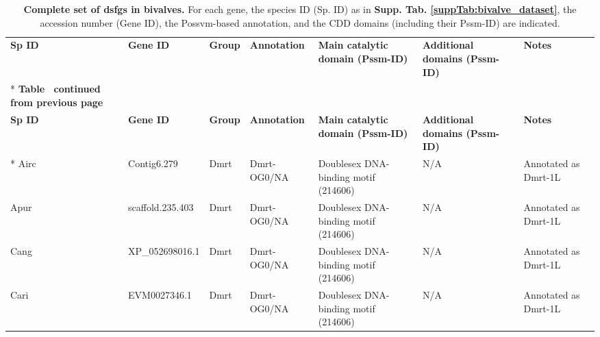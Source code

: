 \documentclass[../main.tex]{subfiles}
\begin{document}
\begin{landscape}
	\tiny
	\begin{longtable}{lllllll}
		\caption{\textbf{Complete set of \glspl{dsfg} in bivalves.} For each gene, the species ID (Sp. ID) as in \textbf{Supp. Tab. \ref{suppTab:bivalve_dataset}}, the accession number (Gene ID), the Possvm-based annotation, and the CDD domains (including their Pssm-ID) are indicated.}
		\label{suppTab:dsfg_bivalveAnnotation}                                                                                                                                                                                      \\
		\toprule
		\textbf{Sp ID} & \textbf{Gene ID}      & \textbf{Group} & \textbf{Annotation} & \textbf{Main catalytic domain (Pssm-ID)}    & \textbf{Additional domains (Pssm-ID)}                                  & \textbf{Notes}       \\* \midrule \midrule
		\endfirsthead
		\multicolumn{7}{c}%
		{{\bfseries Table \thetable\ continued from previous page}}                                                                                                                                                                 \\
		\toprule
		\textbf{Sp ID} & \textbf{Gene ID}      & \textbf{Group} & \textbf{Annotation} & \textbf{Main catalytic domain (Pssm-ID)}    & \textbf{Additional domains (Pssm-ID)}                                  & \textbf{Notes}       \\* \midrule \midrule
		\endhead
		Airc           & Contig6.279           & Dmrt           & Dmrt-OG0/NA         & Doublesex DNA-binding motif (214606)        & N/A                                                                    & Annotated as Dmrt-1L \\
		Apur           & scaffold.235.403      & Dmrt           & Dmrt-OG0/NA         & Doublesex DNA-binding motif (214606)        & N/A                                                                    & Annotated as Dmrt-1L \\
		Cang           & XP\_052698016.1       & Dmrt           & Dmrt-OG0/NA         & Doublesex DNA-binding motif (214606)        & N/A                                                                    & Annotated as Dmrt-1L \\
		Cari           & EVM0027346.1          & Dmrt           & Dmrt-OG0/NA         & Doublesex DNA-binding motif (214606)        & N/A                                                                    & Annotated as Dmrt-1L \\

\end{longtable}
\end{landscape}
\end{document}
